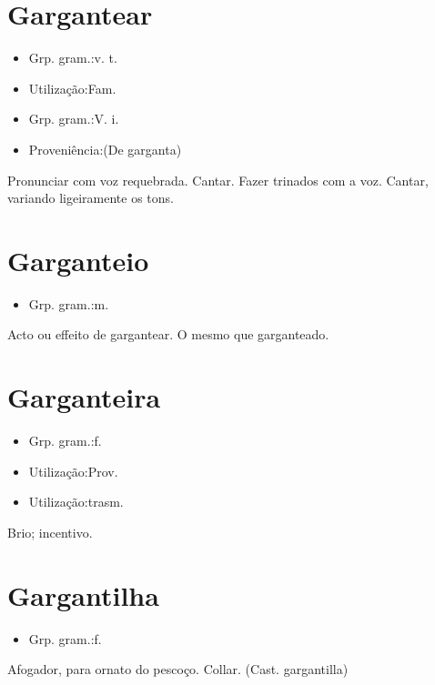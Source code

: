 \section{Gargantear}
\begin{itemize}
\item {Grp. gram.:v. t.}
\end{itemize}
\begin{itemize}
\item {Utilização:Fam.}
\end{itemize}
\begin{itemize}
\item {Grp. gram.:V. i.}
\end{itemize}
\begin{itemize}
\item {Proveniência:(De \textunderscore garganta\textunderscore )}
\end{itemize}
Pronunciar com voz requebrada.
Cantar.
Fazer trinados com a voz.
Cantar, variando ligeiramente os tons.
\section{Garganteio}
\begin{itemize}
\item {Grp. gram.:m.}
\end{itemize}
Acto ou effeito de gargantear.
O mesmo que \textunderscore garganteado\textunderscore .
\section{Garganteira}
\begin{itemize}
\item {Grp. gram.:f.}
\end{itemize}
\begin{itemize}
\item {Utilização:Prov.}
\end{itemize}
\begin{itemize}
\item {Utilização:trasm.}
\end{itemize}
Brio; incentivo.
\section{Gargantilha}
\begin{itemize}
\item {Grp. gram.:f.}
\end{itemize}
Afogador, para ornato do pescoço.
Collar.
(Cast. \textunderscore gargantilla\textunderscore )
